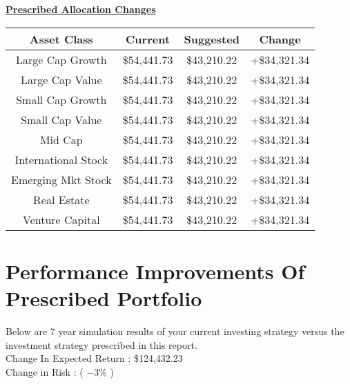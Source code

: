 \documentclass{article}
\begin{document}
\begin{center}
\noindent \large \textbf{\underline{Prescribed Allocation Changes}}\\
\vspace{.5cm}

\normalsize

\begin{tabular}{cccc}
    Asset Class & Current& Suggested & Change\\ \midrule

    Large Cap Growth  & \$54,441.73 & \$43,210.22 & +\$34,321.34 \\\midrule
    Large Cap Value & \$54,441.73 & \$43,210.22 & +\$34,321.34 \\\midrule
    Small Cap Growth & \$54,441.73 & \$43,210.22 & +\$34,321.34 \\\midrule
    Small Cap Value  & \$54,441.73 & \$43,210.22 & +\$34,321.34 \\\midrule
    Mid Cap  & \$54,441.73 & \$43,210.22 & +\$34,321.34 \\\midrule
    International Stock  & \$54,441.73 & \$43,210.22 & +\$34,321.34 \\\midrule

    Emerging Mkt Stock  & \$54,441.73 & \$43,210.22 & +\$34,321.34 \\\midrule

    Real Estate  & \$54,441.73 & \$43,210.22 & +\$34,321.34 \\\midrule
    Venture Capital  & \$54,441.73 & \$43,210.22 & +\$34,321.34
    \\ \bottomrule
\end{tabular}
\end{center}




\newpage

\section{Performance Improvements Of Prescribed Portfolio}

Below are 7 year simulation results of your current investing strategy versus the investment strategy prescribed in this report. \\
Change In Expected Return : \$124,432.23\\
Change in Risk : ( $- 3\%$ )
\end{document}
